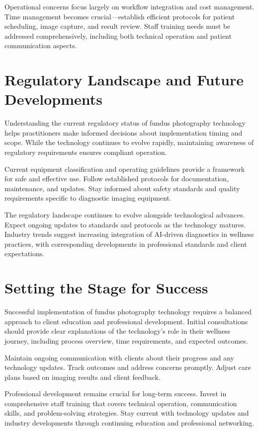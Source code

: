 \documentclass[
  Letterpaper,
]{scrbook}
\begin{document}
Operational concerns focus largely on workflow integration and cost
management. Time management becomes crucial---establish efficient
protocols for patient scheduling, image capture, and result review.
Staff training needs must be addressed comprehensively, including both
technical operation and patient communication aspects.

\section{Regulatory Landscape and Future
Developments}\label{regulatory-landscape-and-future-developments}

Understanding the current regulatory status of fundus photography
technology helps practitioners make informed decisions about
implementation timing and scope. While the technology continues to
evolve rapidly, maintaining awareness of regulatory requirements ensures
compliant operation.

Current equipment classification and operating guidelines provide a
framework for safe and effective use. Follow established protocols for
documentation, maintenance, and updates. Stay informed about safety
standards and quality requirements specific to diagnostic imaging
equipment.

The regulatory landscape continues to evolve alongside technological
advances. Expect ongoing updates to standards and protocols as the
technology matures. Industry trends suggest increasing integration of
AI-driven diagnostics in wellness practices, with corresponding
developments in professional standards and client expectations.

\section{Setting the Stage for
Success}\label{setting-the-stage-for-success}

Successful implementation of fundus photography technology requires a
balanced approach to client education and professional development.
Initial consultations should provide clear explanations of the
technology's role in their wellness journey, including process overview,
time requirements, and expected outcomes.

Maintain ongoing communication with clients about their progress and any
technology updates. Track outcomes and address concerns promptly. Adjust
care plans based on imaging results and client feedback.

Professional development remains crucial for long-term success. Invest
in comprehensive staff training that covers technical operation,
communication skills, and problem-solving strategies. Stay current with
technology updates and industry developments through continuing
education and professional networking.
\end{document}
